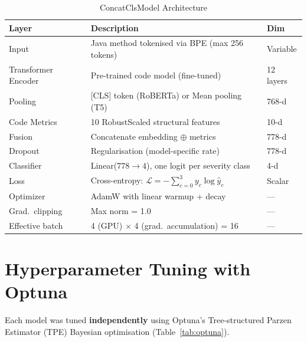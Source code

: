 \documentclass[12pt, a4paper]{report}
\begin{document}
\begin{table}[h!]
\centering
\caption{ConcatClsModel Architecture}
\label{tab:arch}
\begin{tabular}{L{3cm} L{7cm} C{2cm}}
\toprule
\textbf{Layer} & \textbf{Description} & \textbf{Dim} \\
\midrule
Input              & Java method tokenised via BPE (max 256 tokens)         & Variable \\
Transformer Encoder & Pre-trained code model (fine-tuned)                  & 12 layers \\
Pooling            & [CLS] token (RoBERTa) or Mean pooling (T5)             & 768-d \\
Code Metrics       & 10 RobustScaled structural features                    & 10-d \\
Fusion             & Concatenate embedding $\oplus$ metrics                 & 778-d \\
Dropout            & Regularisation (model-specific rate)                   & 778-d \\
Classifier         & Linear($778 \to 4$), one logit per severity class      & 4-d \\
Loss               & Cross-entropy: $\mathcal{L} = -\sum_{c=0}^{3}y_c\log\hat{y}_c$ & Scalar \\
Optimizer          & AdamW with linear warmup + decay                       & --- \\
Grad.\ clipping    & Max norm = 1.0                                         & --- \\
Effective batch    & 4 (GPU) $\times$ 4 (grad.\ accumulation) = 16         & --- \\
\bottomrule
\end{tabular}
\end{table}

\section{Hyperparameter Tuning with Optuna}

Each model was tuned \textbf{independently} using Optuna's Tree-structured Parzen Estimator (TPE) Bayesian optimisation (Table~\ref{tab:optuna}).
\end{document}
